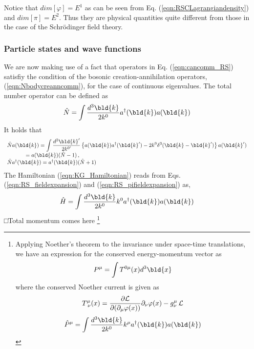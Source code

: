 

Notice that $dim [\varphi] = E^1$ as can be seen from Eq. (\ref{eqn:RSCLagrangiandensity})
and $dim [\pi] = E^2$. Thus they are physical quantities  quite different from
those in the case of the Schr\"odinger field theory.\\

\subsubsection{Particle states and wave functions}
We are now making use of a fact that operators in Eq. (\ref{eqn:cancomm_RS}) satisfiy
the condition of the bosonic creation-annihilation operators, (\ref{eqn:Nbodycreanncomm}), 
for the case of continuous eigenvalues.
The total number operator can be defined as
\begin{equation}
\hat{N} = \int \frac{d^3 \bld{k}}{2k^0} a^\dagger(\bld{k}) a(\bld{k})
\label{eqn:KG_totalNumberOp}
\end{equation}
It holds that
\begin{equation}
\begin{array}{l}
\displaystyle
\hat{N} a(\bld{k}) = 
\int \frac{d^3 \bld{k}'}{2k^{0'}} \left\{
a(\bld{k}) a^\dagger(\bld{k}') - 2 k^0 \delta^3(\bld{k} - \bld{k}') \right\} a(\bld{k}')\\
\hspace{12mm} 
= a(\bld{k}) (\hat{N} - 1)\,,
\\
\hat{N} a^\dagger(\bld{k}) 
= a^\dagger(\bld{k}) (\hat{N} + 1)
\end{array}
\end{equation}
The Hamiltonian (\ref{eqn:KG_Hamiltonian}) reads from 
Eqs. (\ref{eqn:RS_fieldexpansion}) and (\ref{eqn:RS_pifieldexpansion}) as,
\begin{equation}
\hat{H} = \int \frac{d^3 \bld{k}}{2k^0} k^0 a^\dagger(\bld{k}) a(\bld{k})
\label{eqn:KG_Hamiltonian_aadagg}
\end{equation}
□Total momentum comes here
\footnote{
Applying  Noether's theorem to the invariance under space-time translations,
we have an expression for the conserved energy-momentum vector as
\begin{equation*}
P^\mu = \int T^{0 \mu} (x) d^3 \bld{x}
\end{equation*}
where the conserved Noether current is given as
\begin{equation*}
T^{\mu}_{\;\nu} (x) =
\frac{\partial {\cal L}}{\partial (\partial_\mu \varphi(x))}
\partial_\nu \varphi(x) 
- g^\mu_\nu \,{\cal L}
\end{equation*}
\begin{equation*}
\hat{P}^\mu =  \int \frac{d^3 \bld{k}}{2k^0} k^\mu a^\dagger(\bld{k}) a(\bld{k})
\end{equation*}
} %
